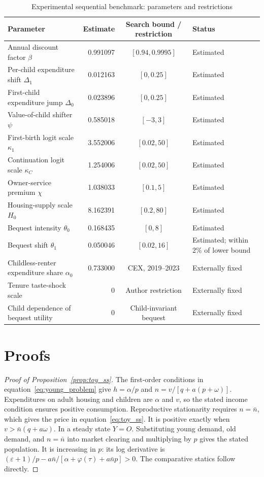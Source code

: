 \documentclass[11pt]{article}
\theoremstyle{definition}
\newcommand{\1}{\mathbf 1}
\begin{document}
\begin{table}[H]
\centering
\caption{Experimental sequential benchmark: parameters and restrictions}
\label{tab:full_parameters}
\scriptsize
\begin{tabularx}{\textwidth}{>{\raggedright\arraybackslash}X r c l}
\toprule
Parameter & Estimate & Search bound / restriction & Status \\
\midrule
Annual discount factor $\beta$ & 0.991097 & $[0.94,0.9995]$ & Estimated \\
Per-child expenditure shift $\Delta_1$ & 0.012163 & $[0,0.25]$ & Estimated \\
First-child expenditure jump $\Delta_0$ & 0.023896 & $[0,0.25]$ & Estimated \\
Value-of-child shifter $\psi$ & 0.585018 & $[-3,3]$ & Estimated \\
First-birth logit scale $\kappa_1$ & 3.552006 & $[0.02,50]$ & Estimated \\
Continuation logit scale $\kappa_C$ & 1.254006 & $[0.02,50]$ & Estimated \\
Owner-service premium $\chi$ & 1.038033 & $[0.1,5]$ & Estimated \\
Housing-supply scale $H_0$ & 8.162391 & $[0.2,80]$ & Estimated \\
Bequest intensity $\theta_0$ & 0.168435 & $[0,8]$ & Estimated \\
Bequest shift $\theta_1$ & 0.050046 & $[0.02,16]$ & Estimated; within 2\% of lower bound \\
Childless-renter expenditure share $\alpha_0$ & 0.733000 & CEX, 2019--2023 & Externally fixed \\
Tenure taste-shock scale & 0 & Author restriction & Externally fixed \\
Child dependence of bequest utility & 0 & Child-invariant bequest & Externally fixed \\
\bottomrule
\end{tabularx}
\end{table}

\section{Proofs}
\label{app:proofs}

\begin{proof}[Proof of Proposition~\ref{prop:toy_ss}]
The first-order conditions in equation~\eqref{eq:young_problem} give
$h=\alpha/p$ and
$n=v/[q+a(p+\omega)]$. Expenditures on adult housing and children are
$\alpha$ and $v$, so the stated income condition ensures positive
consumption. Reproductive stationarity requires $n=\bar n$, which gives the
price in equation~\eqref{eq:toy_ss}. It is positive exactly when
$v>\bar n(q+a\omega)$. In a steady state $Y=O$. Substituting young demand, old
demand, and $n=\bar n$ into market clearing and multiplying by $p$ gives the
stated population. It is increasing in $p$: its log derivative is
$(\varepsilon+1)/p-a\bar n/[\alpha+\varphi(\tau)+a\bar np]>0$. The comparative
statics follow directly.
\end{proof}
\end{document}
